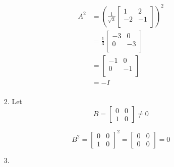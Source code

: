 \documentclass[12pt,letterpaper]{article}
\begin{document}
\begin{enumerate}
\begin{enumerate}
\begin{enumerate}[label=(\alph*)]
              \begin{align*}
                A^2
                &=
                \left(
                \frac{1}{\sqrt{3}}
                \begin{bmatrix}
                  1  & 2 \\
                  -2 & -1 \\
                \end{bmatrix}
                \right)^2
                \\
                &=
                \frac{1}{3}
                \begin{bmatrix}
                  -3 & 0 \\
                  0  & -3 \\
                \end{bmatrix}
                \\
                &=
                \begin{bmatrix}
                  -1 & 0 \\
                  0  & -1 \\
                \end{bmatrix}
                \\
                &=
                -I
                \\
              \end{align*}
            \item

              Let
              \[
                B
                =
                \begin{bmatrix}
                  0 & 0 \\
                  1 & 0
                \end{bmatrix}
                \ne
                0
              \]

              \[
                B^2
                =
                \begin{bmatrix}
                  0 & 0 \\
                  1 & 0
                \end{bmatrix}^2
                =
                \begin{bmatrix}
                  0 & 0 \\
                  0 & 0
                \end{bmatrix}
                =
                0
              \]
            \item


\end{enumerate}
\end{enumerate}
\end{enumerate}
\end{document}
